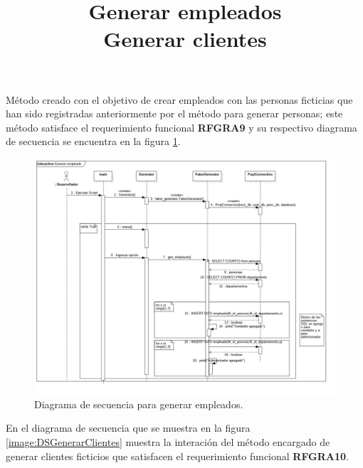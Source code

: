 \title{\textbf{Generar empleados \\}}
Método creado con el objetivo de crear empleados con las personas ficticias que han sido registradas anteriormente por el método para generar personas; este método satisface el requerimiento funcional \textbf{RFGRA9} y su respectivo diagrama de secuencia se encuentra en la figura \ref{image:DSGenerarEmpleados}.
\FloatBarrier
\begin{figure}[htbp!]
		\centering
			\includegraphics[width=1.1 \textwidth]{imagenes/DSRuben/gen_employee_generator}
		\caption{Diagrama de secuencia para generar empleados.}
		\label{image:DSGenerarEmpleados}
\end{figure}
\FloatBarrier





\title{\textbf{Generar clientes\\}}
En el diagrama de secuencia que se muestra en la figura \ref{image:DSGenerarClientes} muestra la interación del método encargado de generar clientes ficticios  que satisfacen el requerimiento funcional \textbf{RFGRA10}.

